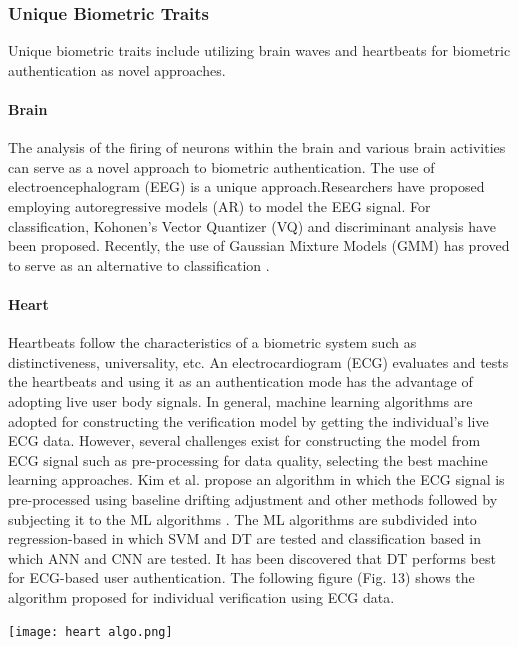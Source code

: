 \documentclass[a4paper, 12pt]{article}
\begin{document}
\subsubsection{Unique Biometric Traits}
Unique biometric traits include utilizing brain waves and heartbeats for biometric authentication as novel approaches.
\paragraph{Brain}
The analysis of the firing of neurons within the brain and various brain activities can serve as a novel approach to biometric authentication. The use of electroencephalogram (EEG) is a unique approach.Researchers have proposed employing autoregressive models (AR) to model the EEG signal. For classification, Kohonen's Vector Quantizer (VQ) and discriminant analysis have been proposed. Recently, the use of Gaussian Mixture Models (GMM) has proved to serve as an alternative to classification \cite{bashir:2015}.
\paragraph{Heart}
Heartbeats follow the characteristics of a biometric system such as distinctiveness, universality, etc. An electrocardiogram (ECG) evaluates and tests the heartbeats and using it as an authentication mode has the advantage of adopting live user body signals. In general, machine learning algorithms are adopted for constructing the verification model by getting the individual's live ECG data. However, several challenges exist for constructing the model from ECG signal such as pre-processing for data quality, selecting the best machine learning approaches.
\vskip 0.2in
\noindent Kim et al. propose an algorithm in which the ECG signal is pre-processed using baseline drifting adjustment and other methods followed by subjecting it to the ML algorithms \cite{kim:2019}. The ML algorithms are subdivided into regression-based in which SVM and DT are tested and classification based in which ANN and CNN are tested. It has been discovered that DT performs best for ECG-based user authentication. The following figure (Fig. 13) shows the algorithm proposed for individual verification using ECG data. 
\vskip 0.2in
\begin{center}
\texttt{[image: heart algo.png]}
\end{center}
\end{document}
